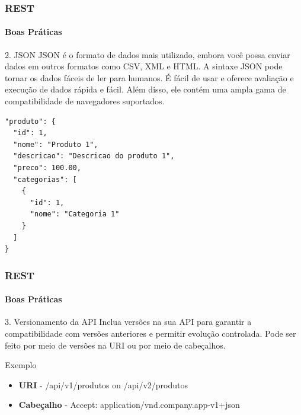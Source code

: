 \documentclass[
	10pt, %
	t, %
]{beamer}
\newcommand{\yellowbox}[1]{\colorbox{yellow!75}{#1}}
\begin{document}
\begin{frame}[fragile]
    \frametitle{REST}
	\framesubtitle{Boas Práticas}

	\begin{block}{2. JSON}
		JSON é o formato de dados mais utilizado, embora você possa enviar dados em outros formatos como CSV, XML e HTML. A sintaxe JSON pode tornar os dados fáceis de ler para humanos. É fácil de usar e oferece avaliação e execução de dados rápida e fácil. Além disso, ele contém uma ampla gama de compatibilidade de navegadores suportados.
    
\begin{lstlisting}[basicstyle=\small]
"produto": {
  "id": 1,
  "nome": "Produto 1",
  "descricao": "Descricao do produto 1",
  "preco": 100.00,
  "categorias": [
	{
	  "id": 1,
	  "nome": "Categoria 1"
	}
  ]
}

\end{lstlisting}
\end{block}
\end{frame}

\begin{frame}
	\frametitle{REST}
	\framesubtitle{Boas Práticas}

	\begin{block}{3. Versionamento da API}
		Inclua versões na sua API para garantir a compatibilidade com versões anteriores e permitir evolução controlada. 
		Pode ser feito por meio de versões na URI ou por meio de cabeçalhos.
	\end{block}

	\begin{exampleblock}{Exemplo}
		\begin{itemize}
			\item \textbf{URI} - \yellowbox{/api/v1/produtos} ou \yellowbox{/api/v2/produtos}
			\item \textbf{Cabeçalho} - \yellowbox{Accept: application/vnd.company.app-v1+json}
		\end{itemize}
	\end{exampleblock}

\end{frame}
\end{document}

